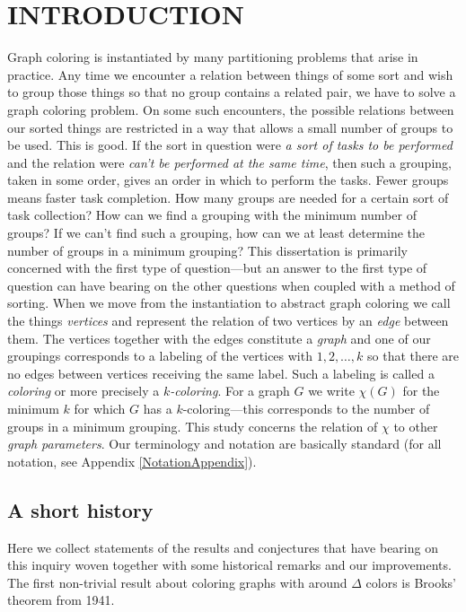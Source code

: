 \chapter{INTRODUCTION}
Graph coloring is instantiated by many partitioning problems that arise in
practice.  Any time we encounter a relation between things of some sort and wish
to group those things so that no group contains a related pair, we have to solve
a graph coloring problem.  On some such encounters, the possible relations
between our sorted things are restricted in a way that allows a small number of
groups to be used.  This is good.  If the sort in question were
\emph{a sort of tasks to be performed} and the relation were \emph{can't be
performed at the same time}, then such a grouping, taken in some order, gives an
order in which to perform the tasks.  Fewer groups means faster task completion.
How many groups are needed for a certain sort of task collection?  How can we
find a grouping with the minimum number of groups?  If we can't find such a
grouping, how can we at least determine the number of groups in a minimum
grouping?  This dissertation is primarily concerned with the first type
of question---but an answer to the first type of question can have bearing
on the other questions when coupled with a method of sorting.  When we move from
the instantiation to abstract graph coloring we call the things \emph{vertices}
and represent the relation of two vertices by an \emph{edge} between them.  The
vertices together with the edges constitute a \emph{graph} and one of our
groupings corresponds to a labeling of the vertices with $1, 2, \ldots, k$ so
that there are no edges between vertices receiving the same label.  Such a labeling is called a
\emph{coloring} or more precisely a \emph{$k$-coloring}. For a graph $G$ we
write $\chi(G)$ for the minimum $k$ for which $G$ has a $k$-coloring---this
corresponds to the number of groups in a minimum grouping.  This study concerns
the relation of $\chi$ to other \emph{graph parameters}.  Our
terminology and notation are basically standard (for all notation, see
Appendix \ref{NotationAppendix}).

\section{A short history}
Here we collect statements of the results and conjectures that have bearing on this inquiry woven together with some historical remarks and our improvements.  
The first non-trivial result about coloring graphs with around $\Delta$ colors is Brooks' theorem from 1941.

